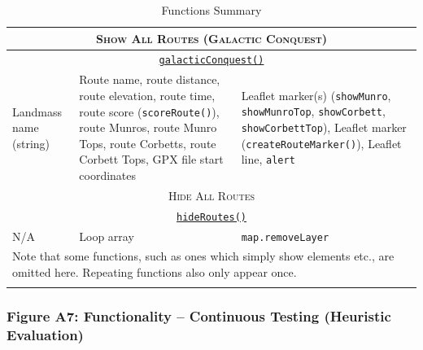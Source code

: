 \documentclass[11pt, english]{article}
\begin{document}
\begin{center}
\begin{longtable}{p{4cm}p{6cm}p{2cm}}
		\hline
		\multicolumn{3}{c}{\textsc{Show All Routes (Galactic Conquest)}}\\
		\hline
		\multicolumn{3}{c}{\underline{\texttt{galacticConquest()}}}\\
		Landmass name (string) & Route name, route distance, route elevation, route time, route score (\texttt{scoreRoute()}), route Munros, route Munro Tops, route Corbetts, route Corbett Tops, GPX file start coordinates & Leaflet marker(s) (\texttt{showMunro}, \texttt{showMunroTop}, \texttt{showCorbett}, \texttt{showCorbettTop}), Leaflet marker (\texttt{createRouteMarker()}), Leaflet line, \texttt{alert}\\
		\hline
		\multicolumn{3}{c}{\textsc{Hide All Routes}}\\
		\hline
		\multicolumn{3}{c}{\underline{\texttt{hideRoutes()}}}\\
		N/A & Loop array & \texttt{map.removeLayer}\\
		\hline
		\multicolumn{3}{p{14cm}}{Note that some functions, such as ones which simply show elements etc., are omitted here. Repeating functions also only appear once.}\\
		\hline
		\caption{Functions Summary}
	\end{longtable}
	\end{center}

\newpage

		\subsubsection*{Figure A7: Functionality -- Continuous Testing (Heuristic Evaluation)}
\end{document}
